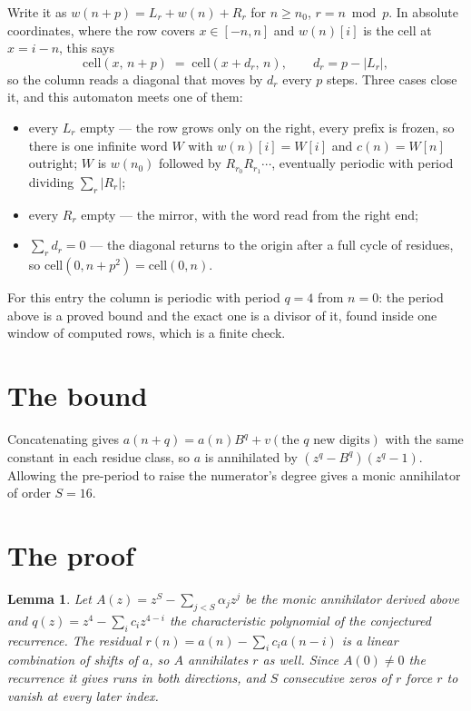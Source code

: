 \documentclass[11pt,a4paper]{article}
\theoremstyle{plain}
\newtheorem{lemma}[theorem]{Lemma}
\theoremstyle{definition}
\begin{document}
Write it as $w(n+p)=L_r+w(n)+R_r$ for $n\ge n_0$, $r=n \bmod p$. In absolute coordinates, where
the row covers $x\in[-n,n]$ and $w(n)[i]$ is the cell at $x=i-n$, this says
\[
\mathrm{cell}(x,\,n+p)\;=\;\mathrm{cell}(x+d_r,\,n),\qquad d_r=p-|L_r| ,
\]
so the column reads a diagonal that moves by $d_r$ every $p$ steps. Three cases close it, and
this automaton meets one of them:

\begin{itemize}
\item every $L_r$ empty --- the row grows only on the right, every prefix is frozen, so there
is one infinite word $W$ with $w(n)[i]=W[i]$ and $c(n)=W[n]$ outright; $W$ is $w(n_0)$ followed
by $R_{r_0}R_{r_1}\cdots$, eventually periodic with period dividing $\sum_r|R_r|$;
\item every $R_r$ empty --- the mirror, with the word read from the right end;
\item $\sum_r d_r=0$ --- the diagonal returns to the origin after a full cycle of residues, so
$\mathrm{cell}(0,n+p^2)=\mathrm{cell}(0,n)$.
\end{itemize}

For this entry the column is periodic with period $q=4$ from $n=0$: the period above is a
proved bound and the exact one is a divisor of it, found inside one window of computed rows,
which is a finite check.

\section{The bound}

Concatenating gives $a(n+q)=a(n)B^{q}+v(\text{the }q\text{ new digits})$ with the same constant in each residue class, so $a$ is annihilated by $(z^{q}-B^{q})(z^{q}-1)$.
Allowing the pre-period to raise the numerator's degree gives a monic annihilator of order
$S=16$.

\section{The proof}

\begin{lemma}\label{lem:crit}
Let $A(z)=z^S-\sum_{j<S}\alpha_jz^{j}$ be the monic annihilator derived above and
$q(z)=z^{4}-\sum_ic_iz^{4-i}$ the characteristic polynomial of the conjectured
recurrence. The residual $r(n)=a(n)-\sum_ic_ia(n-i)$ is a linear combination of shifts of $a$,
so $A$ annihilates $r$ as well. Since $A(0)\ne0$ the recurrence it gives runs in both
directions, and $S$ consecutive zeros of $r$ force $r$ to vanish at every later index.
\end{lemma}
\end{document}
